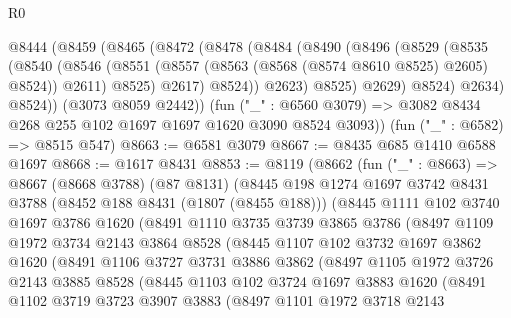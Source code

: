 \begin{lexlean}{R0}
\begin{coremodule}
      @8444
        (@8459
          (@8465
            (@8472
              (@8478
                (@8484
                  (@8490
                    (@8496
                      (@8529
                        (@8535
                          (@8540
                            (@8546
                              (@8551 (@8557 (@8563 (@8568 (@8574 @8610 @8525) @2605) @8524)) @2611)
                              @8525)
                            @2617)
                          @8524))
                      @2623)
                    @8525)
                  @2629)
                @8524)
              @2634)
            @8524))
        (@3073 @8059 @2442))
      (fun ("_" : @6560 @3079) => @3082 @8434 @268 @255 @102 @1697 @1697 @1620 @3090 @8524 @3093))
    (fun ("_" : @6582) => @8515 @547)
@8663 := @6581 @3079
@8667 := @8435 @685 @1410 @6588 @1697
@8668 := @1617 @8431
@8853 := @8119
    (@8662
      (fun ("_" : @8663) =>
      @8667
        (@8668 @3788)
        (@87 @8131)
        (@8445
          @198
          @1274
          @1697
          @3742
          @8431
          @3788
          (@8452 @188 @8431 (@1807 (@8455 @188)))
          (@8445
            @1111
            @102
            @3740
            @1697
            @3786
            @1620
            (@8491
              @1110
              @3735
              @3739
              @3865
              @3786
              (@8497
                @1109
                @1972
                @3734
                @2143
                @3864
                @8528
                (@8445
                  @1107
                  @102
                  @3732
                  @1697
                  @3862
                  @1620
                  (@8491
                    @1106
                    @3727
                    @3731
                    @3886
                    @3862
                    (@8497
                      @1105
                      @1972
                      @3726
                      @2143
                      @3885
                      @8528
                      (@8445
                        @1103
                        @102
                        @3724
                        @1697
                        @3883
                        @1620
                        (@8491
                          @1102
                          @3719
                          @3723
                          @3907
                          @3883
                          (@8497
                            @1101
                            @1972
                            @3718
                            @2143

\end{coremodule}
\end{lexlean}

